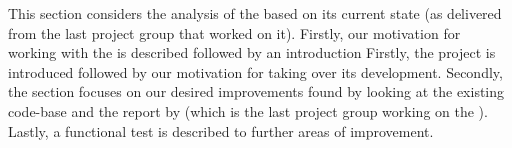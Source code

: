 This section considers the analysis of the \launcher based on its current state (as delivered from the last project group that worked on it).
Firstly, our motivation for working with the \launcher is described followed by an introduction 
Firstly, the \launcher project is introduced followed by our motivation for taking over its development.
Secondly, the section focuses on our desired improvements found by looking at the existing code-base and the report by \citet{launcher2012} (which is the last project group working on the \launcher).
Lastly, a functional test is described to further areas of improvement.